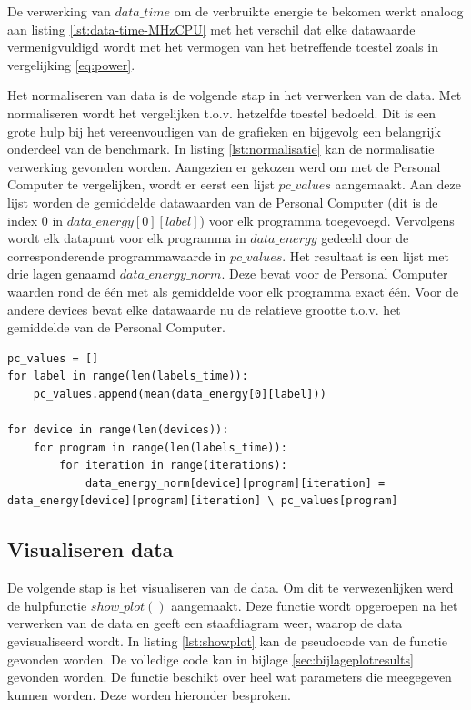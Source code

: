 	De verwerking van $data\_time$ om de verbruikte energie te bekomen werkt analoog aan listing \ref{lst:data-time-MHzCPU} met het verschil dat elke datawaarde vermenigvuldigd wordt met het vermogen van het betreffende toestel zoals in vergelijking \ref{eq:power}.
	
	
	Het normaliseren van data is de volgende stap in het verwerken van de data. Met normaliseren wordt het vergelijken t.o.v. hetzelfde toestel bedoeld. Dit is een grote hulp bij het vereenvoudigen van de grafieken en bijgevolg een belangrijk onderdeel van de benchmark. In listing \ref{lst:normalisatie} kan de normalisatie verwerking gevonden worden. Aangezien er gekozen werd om met de Personal Computer te vergelijken, wordt er eerst een lijst $pc\_values$ aangemaakt. Aan deze lijst worden de gemiddelde datawaarden van de Personal Computer (dit is de index 0 in $data\_energy[0][label]$) voor elk programma toegevoegd. Vervolgens wordt elk datapunt voor elk programma in $data\_energy$ gedeeld door de corresponderende programmawaarde in $pc\_values$. Het resultaat is een lijst met drie lagen genaamd $data\_energy\_norm$. Deze bevat voor de Personal Computer waarden rond de \'e\'en met als gemiddelde voor elk programma exact \'e\'en. Voor de andere devices bevat elke datawaarde nu de relatieve grootte t.o.v. het gemiddelde van de Personal Computer.
	
	\newpage
	
		\begin{lstlisting}[caption={Normalisatie van data\_energy.},captionpos=b, label = {lst:normalisatie}]
pc_values = []
for label in range(len(labels_time)):
	pc_values.append(mean(data_energy[0][label]))

for device in range(len(devices)):
	for program in range(len(labels_time)):
		for iteration in range(iterations):
			data_energy_norm[device][program][iteration] = data_energy[device][program][iteration] \ pc_values[program]
\end{lstlisting}	

	\subsection{Visualiseren data}
 	
 	De volgende stap is het visualiseren van de data. Om dit te verwezenlijken werd de hulpfunctie $show\_plot()$ aangemaakt. Deze functie wordt opgeroepen na het verwerken van de data en geeft een staafdiagram weer, waarop de data gevisualiseerd wordt. In listing \ref{lst:showplot} kan de pseudocode van de functie gevonden worden. De volledige code kan in bijlage \ref{sec:bijlageplotresults} gevonden worden. De functie beschikt over heel wat parameters die meegegeven kunnen worden. Deze worden hieronder besproken.
 	
